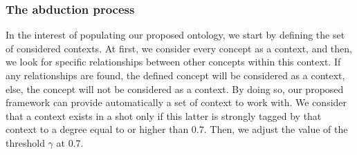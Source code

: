 			\subsubsection{The abduction process}
		In the interest of populating our proposed ontology, we start by defining the set of considered contexts. 
		At first, we consider every concept as a context, and then, we look for specific relationships between other 
		concepts within this context. If any relationships are found, the defined concept will be considered
		as a context, else, the concept will not be considered as a context.
		By doing so, our proposed framework can provide automatically a set of context to work with. We consider 
		that a context exists in a shot only if this latter is strongly tagged by that context to a degree equal 
		to or higher than $0.7$. Then, we adjust the value of the threshold $\gamma$ at $0.7$.

